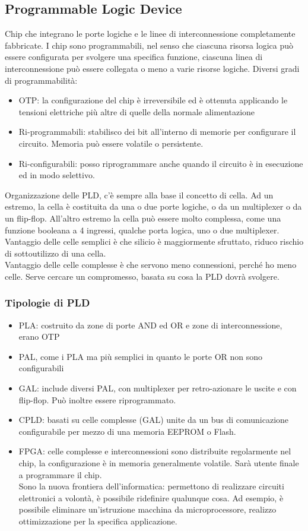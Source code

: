 \documentclass[12pt, oneside]{extbook}
\begin{document}
\subsection{Programmable Logic Device}
Chip che integrano le porte logiche e le linee di interconnessione completamente fabbricate. I chip sono programmabili, nel senso che ciascuna risorsa logica può essere configurata per svolgere una specifica funzione, ciascuna linea di interconnessione può essere collegata o meno a varie risorse logiche. Diversi gradi di programmabilità:
\begin{itemize}
\item OTP: la configurazione del chip è irreversibile ed è ottenuta applicando le tensioni elettriche più altre di quelle della normale alimentazione
\item Ri-programmabili: stabilisco dei bit all'interno di memorie per configurare il circuito. Memoria può essere volatile o persistente.
\item Ri-configurabili: posso riprogrammare anche quando il circuito è in esecuzione ed in modo selettivo.
\end{itemize}
Organizzazione delle PLD, c'è sempre alla base il  concetto di cella. Ad un estremo, la cella è costituita da una o due porte logiche, o da un multiplexer o da un flip-flop. All'altro estremo la cella può essere molto complessa, come una funzione booleana a 4 ingressi, qualche porta logica, uno o due multiplexer.\\ Vantaggio delle celle semplici è che silicio è maggiormente sfruttato, riduco rischio di sottoutilizzo di una cella.\\ Vantaggio delle celle complesse è che servono meno connessioni, perché ho meno celle. Serve cercare un compromesso, basata su cosa la PLD dovrà svolgere.
\subsubsection{Tipologie di PLD}
\begin{itemize}
\item PLA: costruito da zone di porte AND ed OR e zone di interconnessione, erano OTP
\item PAL, come i PLA ma più semplici in quanto le porte OR non sono configurabili
\item GAL: include diversi PAL, con multiplexer per retro-azionare le uscite e con flip-flop. Può inoltre essere riprogrammato.
\item CPLD: basati su celle complesse (GAL) unite da un bus di comunicazione configurabile per mezzo di una memoria EEPROM o Flash.
\item FPGA: celle complesse e interconnessioni sono distribuite regolarmente nel chip, la configurazione è in memoria generalmente volatile. Sarà utente finale a programmare il chip.\\ Sono la nuova frontiera dell'informatica: permettono di realizzare circuiti elettronici a volontà, è possibile ridefinire qualunque cosa. Ad esempio, è possibile eliminare un'istruzione macchina da microprocessore, realizzo ottimizzazione per la specifica applicazione.
\end{itemize}
\end{document}
